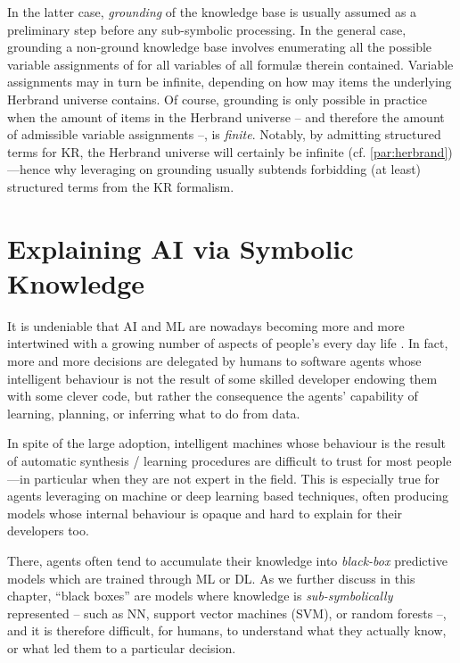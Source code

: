 \documentclass[12pt,a4paper,openright,twoside]{book}
\begin{document}
In the latter case, \emph{grounding} of the knowledge base is usually assumed as a preliminary step before any sub-symbolic processing.
%
In the general case, grounding a non-ground knowledge base involves enumerating all the possible variable assignments of for all variables of all formul\ae{} therein contained.
%
Variable assignments may in turn be infinite, depending on how may items the underlying Herbrand universe contains.
%
Of course, grounding is only possible in practice when the amount of items in the Herbrand universe -- and therefore the amount of admissible variable assignments --, is \emph{finite}.
%
Notably, by admitting structured terms for KR, the Herbrand universe will certainly be infinite (cf. \cref{par:herbrand})---hence why leveraging on grounding usually subtends forbidding (at least) structured terms from the KR formalism.

\chapter{Explaining AI via Symbolic Knowledge}
\label{chap:explaining}

It is undeniable that AI and ML are nowadays becoming more and more intertwined with a growing number of aspects of people's every day life \cite{helbing2019, elliott2019}.
%
In fact, more and more decisions are delegated by humans to software agents whose intelligent behaviour is not the result of some skilled developer endowing them with some clever code, but rather the consequence the agents' capability of learning, planning, or inferring what to do from data.

In spite of the large adoption, intelligent machines whose behaviour is the result of automatic synthesis / learning procedures are difficult to trust for most people---in particular when they are not expert in the field.
%
This is especially true for agents leveraging on machine or deep learning based techniques, often producing models whose internal behaviour is opaque and hard to explain for their developers too.

There, agents often tend to accumulate their knowledge into \emph{black-box} predictive models which are trained through ML or DL.
%
As we further discuss in this chapter, ``black boxes'' are models where knowledge is \emph{sub-symbolically} represented -- such as NN, support vector machines (SVM), or random forests --, and it is therefore difficult, for humans, to understand what they actually know, or what led them to a particular decision.
\end{document}
